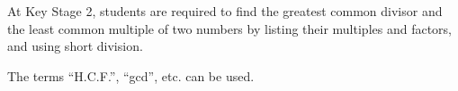 At Key Stage 2, students are required to find
the greatest common divisor and the least
common multiple of two numbers by listing
their multiples and factors, and using short
division.



The terms “H.C.F.”, “gcd”, etc. can be used.







\section{}








\section{}

















\section{}













